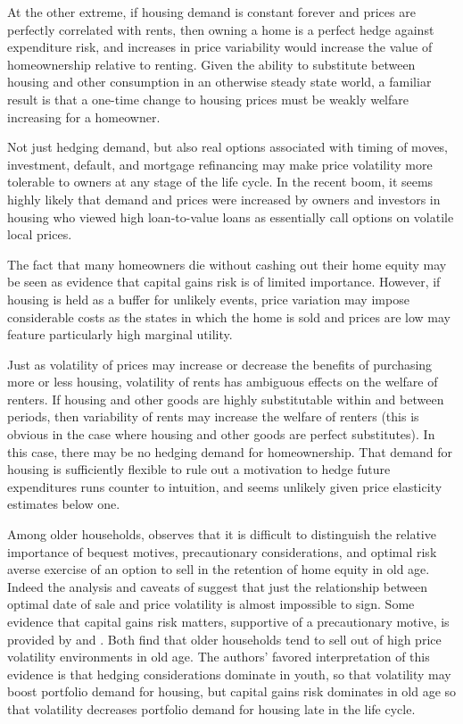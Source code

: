 \documentclass[12pt]{article}
\begin{document}
At the other extreme, if housing demand is constant forever and prices are
perfectly correlated with rents, then owning a home is a perfect hedge against
expenditure risk, and increases in price variability would increase the value of
homeownership relative to renting.  Given the ability to substitute between
housing and other consumption in an otherwise steady state world, a familiar
result is that a one-time change to housing prices must be weakly welfare
increasing for a homeowner.

Not just hedging demand, but also real options associated with timing of moves,
investment, default, and mortgage refinancing may make price volatility more
tolerable to owners at any stage of the life cycle.  In the recent boom, it
seems highly likely that demand and prices were increased by owners and
investors in housing who viewed high loan-to-value loans as essentially call
options on volatile local prices.

The fact that many homeowners die without cashing out their home equity may be
seen as evidence that capital gains risk is of limited importance.   However, if
housing is held as a buffer for unlikely events, price variation may impose
considerable costs as the states in which the home is sold and prices are low
may feature particularly high marginal utility.  

Just as volatility of prices may increase or decrease the benefits of purchasing
more or less housing, volatility of rents has ambiguous effects on the welfare
of renters.  If housing and other goods are highly substitutable within and
between periods, then variability of rents may increase the welfare of renters
(this is obvious in the case where housing and other goods are perfect
substitutes).  In this case, there may be no hedging demand for homeownership.
That demand for housing is sufficiently flexible to rule out a motivation to
hedge future expenditures runs counter to intuition, and seems unlikely given
price elasticity estimates below one.

Among older households, \citet{Skinner} observes that it is difficult to
distinguish the relative importance of bequest motives, precautionary
considerations, and optimal risk averse exercise of an option to sell in the
retention of home equity in old age.  Indeed the analysis and caveats of
\citet{EvansHendersonHobson} suggest that just the relationship between optimal
date of sale and price volatility is almost impossible to sign.  Some evidence
that capital gains risk matters, supportive of a precautionary motive, is
provided by \citet{BanksBlundellOldfieldSmith} and \citet{SinaiSouleles}.  Both
find that older households tend to sell out of high price volatility
environments in old age.  The authors' favored interpretation of this evidence
is that hedging considerations dominate in youth, so that volatility may boost
portfolio demand for housing, but capital gains risk dominates in old age so
that volatility decreases portfolio demand for housing late in the life cycle.
\end{document}
